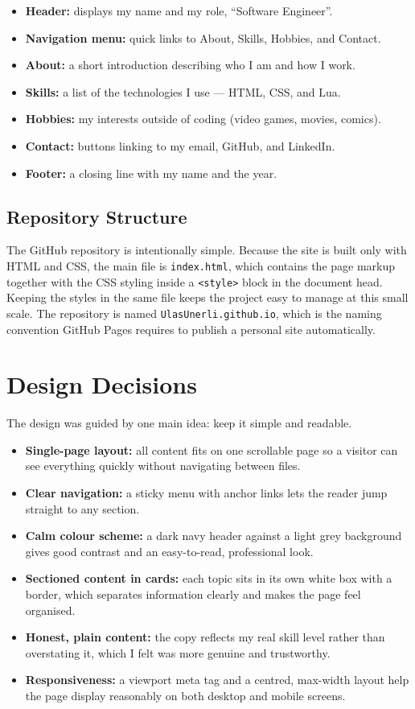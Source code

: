 \documentclass[11pt,a4paper]{article}
\begin{document}
\begin{itemize}
  \item \textbf{Header:} displays my name and my role, ``Software Engineer''.
  \item \textbf{Navigation menu:} quick links to About, Skills, Hobbies, and Contact.
  \item \textbf{About:} a short introduction describing who I am and how I work.
  \item \textbf{Skills:} a list of the technologies I use --- HTML, CSS, and Lua.
  \item \textbf{Hobbies:} my interests outside of coding (video games, movies, comics).
  \item \textbf{Contact:} buttons linking to my email, GitHub, and LinkedIn.
  \item \textbf{Footer:} a closing line with my name and the year.
\end{itemize}

\subsection{Repository Structure}
The GitHub repository is intentionally simple. Because the site is built only
with HTML and CSS, the main file is \texttt{index.html}, which contains the page
markup together with the CSS styling inside a \texttt{<style>} block in the
document head. Keeping the styles in the same file keeps the project easy to
manage at this small scale. The repository is named
\texttt{UlasUnerli.github.io}, which is the naming convention GitHub Pages
requires to publish a personal site automatically.

\section{Design Decisions}
The design was guided by one main idea: keep it simple and readable.

\begin{itemize}
  \item \textbf{Single-page layout:} all content fits on one scrollable page so
    a visitor can see everything quickly without navigating between files.
  \item \textbf{Clear navigation:} a sticky menu with anchor links lets the
    reader jump straight to any section.
  \item \textbf{Calm colour scheme:} a dark navy header against a light grey
    background gives good contrast and an easy-to-read, professional look.
  \item \textbf{Sectioned content in cards:} each topic sits in its own white
    box with a border, which separates information clearly and makes the page
    feel organised.
  \item \textbf{Honest, plain content:} the copy reflects my real skill level
    rather than overstating it, which I felt was more genuine and trustworthy.
  \item \textbf{Responsiveness:} a viewport meta tag and a centred, max-width
    layout help the page display reasonably on both desktop and mobile screens.
\end{itemize}
\end{document}
